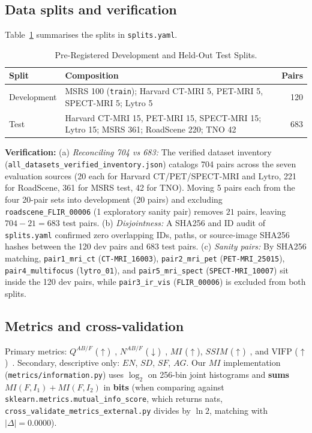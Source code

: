 \documentclass[conference]{IEEEtran}
\begin{document}
\subsection{Data splits and verification}
Table~\ref{tab:splits} summarises the splits in \texttt{splits.yaml}.
\begin{table}[htbp]
\caption{Pre-Registered Development and Held-Out Test Splits.}
\label{tab:splits}
\centering
\begin{tabular}{lp{4.8cm}r}
\toprule
\textbf{Split} & \textbf{Composition} & \textbf{Pairs} \\
\midrule
Development & MSRS 100 (\texttt{train}); Harvard CT-MRI 5, PET-MRI 5, SPECT-MRI 5; Lytro 5 & 120 \\
Test & Harvard CT-MRI 15, PET-MRI 15, SPECT-MRI 15; Lytro 15; MSRS 361; RoadScene 220; TNO 42 & 683 \\
\bottomrule
\end{tabular}
\end{table}

\textbf{Verification:} (a) \emph{Reconciling 704 vs 683:} The verified dataset inventory (\texttt{all\_datasets\_verified\_inventory.json}) catalogs 704 pairs across the seven evaluation sources (20 each for Harvard CT/PET/SPECT-MRI and Lytro, 221 for RoadScene, 361 for MSRS test, 42 for TNO). Moving 5 pairs each from the four 20-pair sets into development ($20$ pairs) and excluding \texttt{roadscene\_FLIR\_00006} (1 exploratory sanity pair) removes $21$ pairs, leaving $704 - 21 = 683$ test pairs. (b) \emph{Disjointness:} A SHA256 and ID audit of \texttt{splits.yaml} confirmed zero overlapping IDs, paths, or source-image SHA256 hashes between the 120 dev pairs and 683 test pairs. (c) \emph{Sanity pairs:} By SHA256 matching, \texttt{pair1\_mri\_ct} (\texttt{CT-MRI\_16003}), \texttt{pair2\_mri\_pet} (\texttt{PET-MRI\_25015}), \texttt{pair4\_multifocus} (\texttt{lytro\_01}), and \texttt{pair5\_mri\_spect} (\texttt{SPECT-MRI\_10007}) sit inside the 120 dev pairs, while \texttt{pair3\_ir\_vis} (\texttt{FLIR\_00006}) is excluded from both splits.

\subsection{Metrics and cross-validation}
Primary metrics: $Q^{AB/F}$ ($\uparrow$)~\cite{xydeas2000objective,petrovic2005}, $N^{AB/F}$ ($\downarrow$)~\cite{petrovic2005}, $MI$ ($\uparrow$), $SSIM$ ($\uparrow$)~\cite{wang2004image}, and $\mathrm{VIFP}$ ($\uparrow$)~\cite{sheikh2006image}. Secondary, descriptive only: $EN$, $SD$, $SF$, $AG$. Our $MI$ implementation (\texttt{metrics/information.py}) uses $\log_2$ on 256-bin joint histograms and \textbf{sums} $MI(F,I_1)+MI(F,I_2)$ in \textbf{bits} (when comparing against \texttt{sklearn.metrics.mutual\_info\_score}, which returns nats, \texttt{cross\_validate\_metrics\_external.py} divides by $\ln 2$, matching with $|\Delta|=0.0000$).
\end{document}
